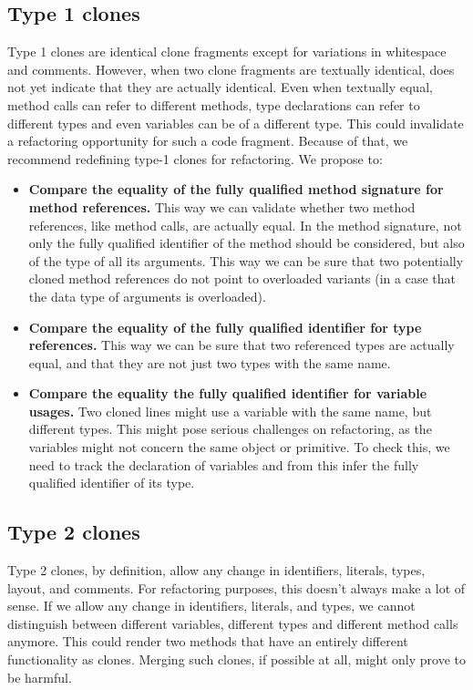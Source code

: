 \documentclass[a4paper]{article}
\begin{document}
\subsection{Type 1 clones} \label{chap:type1clones}
Type 1 clones are identical clone fragments except for variations in whitespace and comments. However, when two clone fragments are textually identical, does not yet indicate that they are actually identical. Even when textually equal, method calls can refer to different methods, type declarations can refer to different types and even variables can be of a different type. This could invalidate a refactoring opportunity for such a code fragment. Because of that, we recommend redefining type-1 clones for refactoring. We propose to:
\begin{itemize}
  \item \textbf{Compare the equality of the fully qualified method signature for method references.} This way we can validate whether two method references, like method calls, are actually equal. In the method signature, not only the fully qualified identifier of the method should be considered, but also of the type of all its arguments. This way we can be sure that two potentially cloned method references do not point to overloaded variants (in a case that the data type of arguments is overloaded).
  \item \textbf{Compare the equality of the fully qualified identifier for type references.} This way we can be sure that two referenced types are actually equal, and that they are not just two types with the same name.
  \item \textbf{Compare the equality the fully qualified identifier for variable usages.} Two cloned lines might use a variable with the same name, but different types. This might pose serious challenges on refactoring, as the variables might not concern the same object or primitive. To check this, we need to track the declaration of variables and from this infer the fully qualified identifier of its type.
\end{itemize}

\subsection{Type 2 clones}
Type 2 clones, by definition, allow any change in identifiers, literals, types, layout, and comments. For refactoring purposes, this doesn't always make a lot of sense. If we allow any change in identifiers, literals, and types, we cannot distinguish between different variables, different types and different method calls anymore. This could render two methods that have an entirely different functionality as clones. Merging such clones, if possible at all, might only prove to be harmful.
\end{document}
